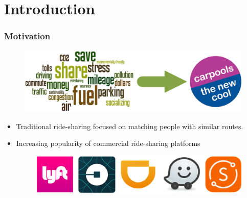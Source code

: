 \documentclass[t]{beamer}
\begin{document}
\section*{Introduction}
\begin{frame}\frametitle{Motivation}
\begin{figure}
	\centering
    \includegraphics[width = 0.75\columnwidth]{carpool.eps}
\end{figure}
\begin{itemize}
\item<2-> Traditional ride-sharing focused on matching people with similar routes.
\item<3-> Increasing popularity of commercial ride-sharing platforms
\begin{figure}
	\centering
    \includegraphics[width = 0.55\columnwidth]{ride-sharings.eps}
\end{figure}
\end{itemize}
\end{frame}
\end{document}
